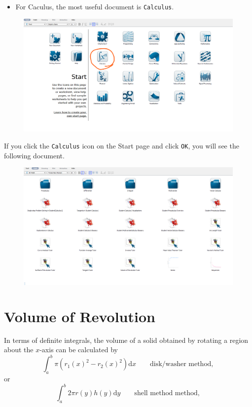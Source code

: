 \documentclass[]{book}
\providecommand{\tightlist}{%
  \setlength{\itemsep}{0pt}\setlength{\parskip}{0pt}}
\theoremstyle{definition}
\theoremstyle{definition}
\theoremstyle{definition}
\theoremstyle{remark}
\begin{document}
\begin{itemize}
\tightlist
\item
  For Caculus, the most useful document is \texttt{Calculus}.
\end{itemize}

\begin{figure}
\centering
\includegraphics{figs/Start-Page-Calculus.png}
\caption{}
\end{figure}

If you click the \texttt{Calculus} icon on the Start page and click
\texttt{OK}, you will see the following document.

\begin{figure}
\centering
\includegraphics{figs/Calculus-Doc.png}
\caption{}
\end{figure}

\chapter{Volume of Revolution}\label{volume-of-revolution}

In terms of definite integrals, the volume of a solid obtained by
rotating a region about the \(x\)-axis can be calculated by
\[\int_a^b \pi (r_1(x)^2 - r_2(x)^2) \mathrm{d} x \qquad \text{disk/washer method},\]
or
\[\int_a^b 2\pi r(y) h(y) \mathrm{d} y \qquad \text{shell method method},\]
\end{document}
